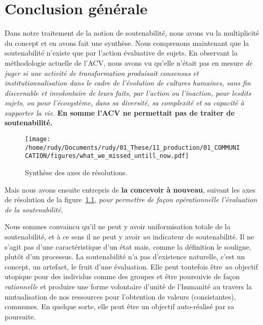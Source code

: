 \chapter{Conclusion générale}

Dans notre traitement de la notion de soutenabilité, nous avons vu la multiplicité du concept et en avons fait une synthèse.
Nous comprenons maintenant que la soutenabilité n'existe que par l'action évaluative de sujets.
En observant la méthodologie actuelle de l'ACV, nous avons vu qu'elle n'était pas en mesure \emph{de juger si une activité de transformation produisait consensus et institutionnalisation dans le cadre de l'évolution de cultures humaines, sans fin discernable et involontaire de leurs faits, par l'action ou l'inaction, pour lesdits sujets, ou pour l'écosystème, dans sa diversité, sa complexité et sa capacité à supporter la vie.}
\textbf{En somme l'\gls{ACV} ne permettait pas de traiter de soutenabilité.}

\begin{figure}[htbp]
\centering
\texttt{[image: /home/rudy/Documents/rudy/01\_These/11\_production/01\_COMMUNICATION/figures/what\_we\_missed\_untill\_now.pdf]}
\caption{Synthèse des axes de résolutions.}
\label{fig:what_we_missed_untill_now}
\end{figure}

Mais nous avons ensuite entrepris de \textbf{la concevoir à nouveau}, suivant les axes de résolution de la figure~\ref{fig:what_we_missed_untill_now}, \emph{pour permettre de façon opérationnelle l'évaluation de la soutenabilité}.

Nous sommes convaincu qu'il ne peut y avoir uniformisation totale de la soutenabilité, et à ce sens il ne peut y avoir \textit{un} indicateur de soutenabilité.
Il ne s'agit pas d'une caractéristique d'un état mais, comme la définition le souligne, plutôt d'un processus.
La soutenabilité n'a pas d’existence naturelle, c'est un concept, un artefact, le fruit d'une évaluation.
Elle peut toutefois être \emph{un} objectif utopique pour des individus comme des groupes et être poursuivie de façon \emph{rationnelle} et produire une forme volontaire d'unité de l'humanité au travers la mutualisation de nos ressources pour l'obtention de valeurs (consistantes), communes.
En quelque sorte, elle peut être un objectif auto-réalisé par sa poursuite.

